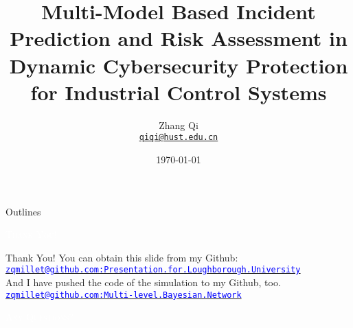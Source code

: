 \documentclass[10pt, compress]{beamer}
\title{Multi-Model Based Incident Prediction and Risk Assessment in Dynamic Cybersecurity Protection for Industrial Control Systems}
\subtitle{}
\date{\today}
\author[Zhang Qi] %
{
  Zhang Qi\\
  \href{mailto:qiqi@hust.edu.cn}{{\tt qiqi@hust.edu.cn}}
}
\institute{Automation School,\\Huazhong University of Science and Technology,\\Wuhan.}
\begin{document}
\maketitle

\begin{frame}[noframenumbering]{Outlines}
    \tableofcontents %
\end{frame}

%
%
%
%
%


\begin{frame}{}    
    \centering
    \vfill\vspace{1em}\textcolor{white}{\scshape Thank You!}\vfill
\end{frame}


\begin{frame}{Thank You!}
    You can obtain this slide from my Github:\\
    \href{https://github.com/zqmillet/Presentation.for.Loughborough.University}{\tt \small \textcolor{blue}{zqmillet@github.com:Presentation.for.Loughborough.University}}\\[15pt]

    \pause
    And I have pushed the code of the simulation to my Github, too.\\
    \href{https://github.com/zqmillet/Multi-level.Bayesian.Network}{\tt \small \textcolor{blue}{zqmillet@github.com:Multi-level.Bayesian.Network}}\\[15pt]
    
\end{frame}

\begin{frame}{}
    \centering
    \vfill\vspace{1em}\textcolor{white}{\scshape Any Questions?}\vfill
\end{frame}
\end{document}
